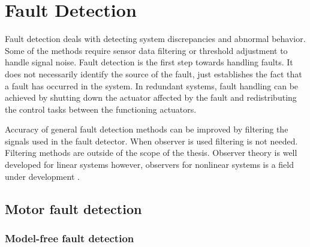 \newpage
\section{Fault Detection}

Fault detection deals with detecting system discrepancies and abnormal behavior. Some of the methods require sensor data filtering or threshold adjustment to handle signal noise. Fault detection is the first step towards handling faults. It does not necessarily identify the source of the fault, just establishes the fact that a fault has occurred in the system. In redundant systems, fault handling can be achieved by shutting down the actuator affected by the fault and redistributing the control tasks between the functioning actuators.

Accuracy of general fault detection methods can be improved by filtering the signals used in the fault detector. When observer is used filtering is not needed. Filtering methods are outside of the scope of the thesis. Observer theory is well developed for linear systems however, observers for nonlinear systems is a field under development \cite{bokor}. 


\subsection{Motor fault detection}


\subsubsection{Model-free fault detection}















